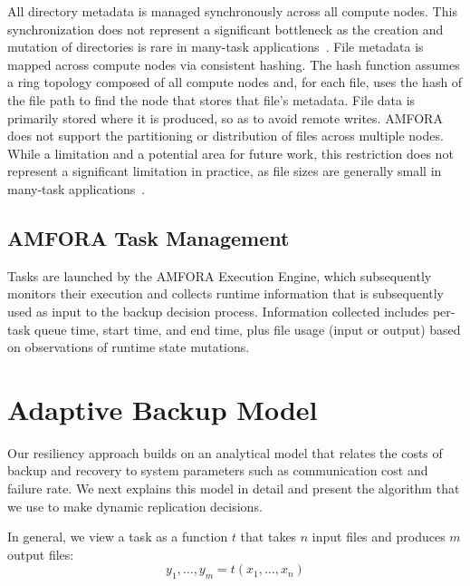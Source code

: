 \documentclass{sig-alternate}
\begin{document}
All directory metadata is managed synchronously across all compute nodes. This synchronization does not represent
a significant bottleneck as the creation 
and mutation of directories is rare in many-task applications~\cite{MTC-Bluewaters}.
File metadata is mapped across compute nodes via consistent hashing. 
The hash function assumes a ring topology composed of all compute nodes and, for each file,
uses the hash of the file path to find the node that stores that file's metadata.
File data is primarily stored where it is produced, so as to avoid remote writes. AMFORA does not
support the partitioning or distribution of files across multiple nodes. While a limitation and 
a potential area for future work, this restriction does not represent a significant limitation in practice, as file sizes are generally
small in many-task applications~\cite{MTC-Bluewaters}. 

\subsection{AMFORA Task Management}
Tasks are launched by the AMFORA Execution Engine, which subsequently monitors their execution and collects runtime information
that is subsequently used as input to the backup decision process.
Information collected includes per-task queue time, start time, and end time, plus file usage (input or output) based on observations
of runtime state mutations.




\section{Adaptive Backup Model}
\label{sec:Model}

Our resiliency approach builds on an analytical model that relates the costs of backup and recovery to system parameters
such as communication cost and failure rate.
We next explains this model in detail and present the algorithm that we use to make dynamic replication decisions. 

In general, we view a task as a function $t$ that takes $n$ input files and produces $m$ output files:
\begin{equation}
y_{1}, \ldots, y_{m} = t(x_{1}, \ldots, x_{n})
\end{equation}
\end{document}
